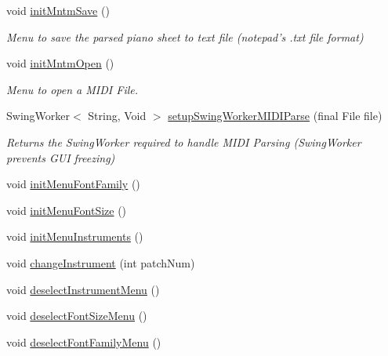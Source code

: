 \begin{DoxyCompactItemize}
void \hyperlink{classcom_1_1lclion_1_1midigui_1_1_j_frame_m_i_d_i_piano_sheet_creator_a2b96b6ece7e72836a6e472f85951e297}{init\+Mntm\+Save} ()
\begin{DoxyCompactList}\small\item\em Menu to save the parsed piano sheet to text file (notepad's .txt file format) \end{DoxyCompactList}\item 
void \hyperlink{classcom_1_1lclion_1_1midigui_1_1_j_frame_m_i_d_i_piano_sheet_creator_a6de8f8799e0b919151dd7d602565c867}{init\+Mntm\+Open} ()
\begin{DoxyCompactList}\small\item\em Menu to open a M\+I\+D\+I File. \end{DoxyCompactList}\item 
Swing\+Worker$<$ String, Void $>$ \hyperlink{classcom_1_1lclion_1_1midigui_1_1_j_frame_m_i_d_i_piano_sheet_creator_aae03cd254fec1d9f47948ce62a294baf}{setup\+Swing\+Worker\+M\+I\+D\+I\+Parse} (final File file)
\begin{DoxyCompactList}\small\item\em Returns the Swing\+Worker required to handle M\+I\+D\+I Parsing (Swing\+Worker prevents G\+U\+I freezing) \end{DoxyCompactList}\item 
void \hyperlink{classcom_1_1lclion_1_1midigui_1_1_j_frame_m_i_d_i_piano_sheet_creator_a69eddc42278f45218c12c51637b36d34}{init\+Menu\+Font\+Family} ()
\item 
void \hyperlink{classcom_1_1lclion_1_1midigui_1_1_j_frame_m_i_d_i_piano_sheet_creator_a508329abe82be4cf7842ca7c468f18c8}{init\+Menu\+Font\+Size} ()
\item 
void \hyperlink{classcom_1_1lclion_1_1midigui_1_1_j_frame_m_i_d_i_piano_sheet_creator_a200519724ded34307a2e8c0cd6497a56}{init\+Menu\+Instruments} ()
\item 
void \hyperlink{classcom_1_1lclion_1_1midigui_1_1_j_frame_m_i_d_i_piano_sheet_creator_ae7bd958cecc96a4e5d1ea09834b6d0ef}{change\+Instrument} (int patch\+Num)
\item 
void \hyperlink{classcom_1_1lclion_1_1midigui_1_1_j_frame_m_i_d_i_piano_sheet_creator_ab26c4708edb6e0b42d4988caf68b1ec0}{deselect\+Instrument\+Menu} ()
\item 
void \hyperlink{classcom_1_1lclion_1_1midigui_1_1_j_frame_m_i_d_i_piano_sheet_creator_acb131a460e9412367d53ee82a9375859}{deselect\+Font\+Size\+Menu} ()
\item 
void \hyperlink{classcom_1_1lclion_1_1midigui_1_1_j_frame_m_i_d_i_piano_sheet_creator_a9af7c5fe9801b9b06b53613d2ccd2238}{deselect\+Font\+Family\+Menu} ()
\end{DoxyCompactItemize}
